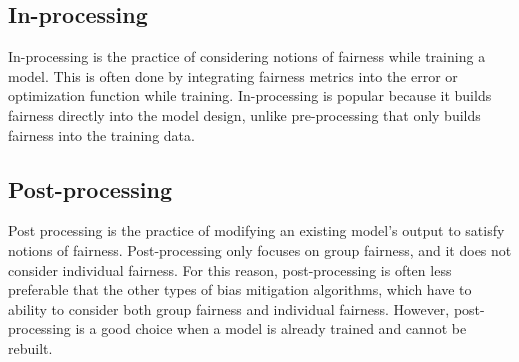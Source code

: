 \documentclass[assignment03_Solutions]{subfiles}
\begin{document}
 \subsection*{In-processing}
 In-processing is the practice of considering notions of fairness while training a model. This is often done by integrating fairness metrics into the error or optimization function while training. In-processing is popular because it builds fairness directly into the model design, unlike pre-processing that only builds fairness into the training data.
\subsection*{Post-processing}
Post processing is the practice of modifying an existing model’s output to satisfy notions of fairness. Post-processing only focuses on group fairness, and it does not consider individual fairness. For this reason, post-processing is often less preferable that the other types of bias mitigation algorithms, which have to ability to consider both group fairness and individual fairness. However, post-processing is a good choice when a model is already trained and cannot be rebuilt.
\end{document}
